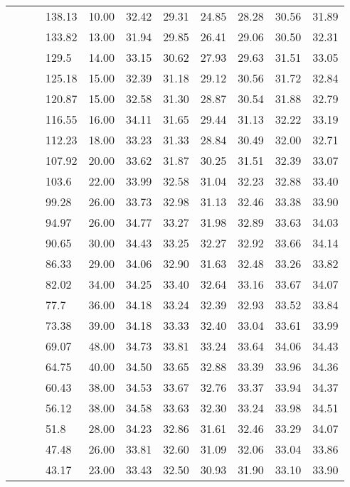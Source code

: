 \begin{longtable}{llllrrrrrrr}
   &  &  & 138.13 & 10.00 & 32.42 & 29.31 & 24.85 & 28.28 & 30.56 & 31.89 \\ 
   &  &  & 133.82 & 13.00 & 31.94 & 29.85 & 26.41 & 29.06 & 30.50 & 32.31 \\ 
   &  &  & 129.5 & 14.00 & 33.15 & 30.62 & 27.93 & 29.63 & 31.51 & 33.05 \\ 
   &  &  & 125.18 & 15.00 & 32.39 & 31.18 & 29.12 & 30.56 & 31.72 & 32.84 \\ 
   &  &  & 120.87 & 15.00 & 32.58 & 31.30 & 28.87 & 30.54 & 31.88 & 32.79 \\ 
   &  &  & 116.55 & 16.00 & 34.11 & 31.65 & 29.44 & 31.13 & 32.22 & 33.19 \\ 
   &  &  & 112.23 & 18.00 & 33.23 & 31.33 & 28.84 & 30.49 & 32.00 & 32.71 \\ 
   &  &  & 107.92 & 20.00 & 33.62 & 31.87 & 30.25 & 31.51 & 32.39 & 33.07 \\ 
   &  &  & 103.6 & 22.00 & 33.99 & 32.58 & 31.04 & 32.23 & 32.88 & 33.40 \\ 
   &  &  & 99.28 & 26.00 & 33.73 & 32.98 & 31.13 & 32.46 & 33.38 & 33.90 \\ 
   &  &  & 94.97 & 26.00 & 34.77 & 33.27 & 31.98 & 32.89 & 33.63 & 34.03 \\ 
   &  &  & 90.65 & 30.00 & 34.43 & 33.25 & 32.27 & 32.92 & 33.66 & 34.14 \\ 
   &  &  & 86.33 & 29.00 & 34.06 & 32.90 & 31.63 & 32.48 & 33.26 & 33.82 \\ 
   &  &  & 82.02 & 34.00 & 34.25 & 33.40 & 32.64 & 33.16 & 33.67 & 34.07 \\ 
   &  &  & 77.7 & 36.00 & 34.18 & 33.24 & 32.39 & 32.93 & 33.52 & 33.84 \\ 
   &  &  & 73.38 & 39.00 & 34.18 & 33.33 & 32.40 & 33.04 & 33.61 & 33.99 \\ 
   &  &  & 69.07 & 48.00 & 34.73 & 33.81 & 33.24 & 33.64 & 34.06 & 34.43 \\ 
   &  &  & 64.75 & 40.00 & 34.50 & 33.65 & 32.88 & 33.39 & 33.96 & 34.36 \\ 
   &  &  & 60.43 & 38.00 & 34.53 & 33.67 & 32.76 & 33.37 & 33.94 & 34.37 \\ 
   &  &  & 56.12 & 38.00 & 34.58 & 33.63 & 32.30 & 33.24 & 33.98 & 34.51 \\ 
   &  &  & 51.8 & 28.00 & 34.23 & 32.86 & 31.61 & 32.46 & 33.29 & 34.07 \\ 
   &  &  & 47.48 & 26.00 & 33.81 & 32.60 & 31.09 & 32.06 & 33.04 & 33.86 \\ 
   &  &  & 43.17 & 23.00 & 33.43 & 32.50 & 30.93 & 31.90 & 33.10 & 33.90 \\ 

\end{longtable}
